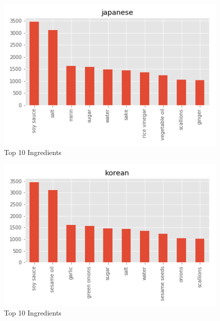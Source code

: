 \documentclass[sigconf]{acmart}
\begin{document}
\begin{figure}[!ht]
  \centering\includegraphics[width=\columnwidth]{images/japanese_10_most_used_ingredients.png}
  \caption{Top 10 Ingredients }\label{f:japanese_10_most_used_ingredients}
\end{figure}

\begin{figure}[!ht]
  \centering\includegraphics[width=\columnwidth]{images/korean_10_most_used_ingredients.png}
  \caption{Top 10 Ingredients }\label{f:korean_10_most_used_ingredients}
\end{figure}
\end{document}
